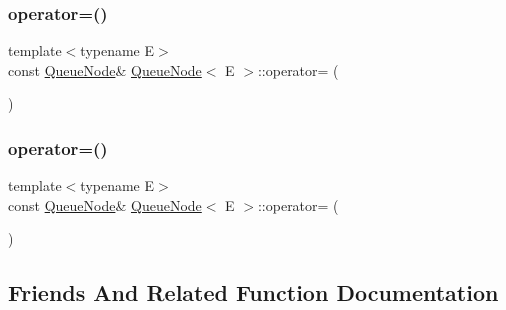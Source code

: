 \mbox{\label{class_queue_node_a8635bbe6310e011ef4fcf1a01566dbb7}} 
\subsubsection{\texorpdfstring{operator=()}{operator=()}\hspace{0.1cm}{\footnotesize\ttfamily [2/3]}}
{\footnotesize\ttfamily template$<$typename E$>$ \\
const \mbox{\hyperlink{class_queue_node}{Queue\+Node}}\& \mbox{\hyperlink{class_queue_node}{Queue\+Node}}$<$ E $>$\+::operator= (\begin{DoxyParamCaption}\item[{const \mbox{\hyperlink{class_queue_node}{Queue\+Node}}$<$ E $>$ \&}]{ }\end{DoxyParamCaption})\hspace{0.3cm}{\ttfamily [private]}}

\mbox{\label{class_queue_node_a8635bbe6310e011ef4fcf1a01566dbb7}} 
\subsubsection{\texorpdfstring{operator=()}{operator=()}\hspace{0.1cm}{\footnotesize\ttfamily [3/3]}}
{\footnotesize\ttfamily template$<$typename E$>$ \\
const \mbox{\hyperlink{class_queue_node}{Queue\+Node}}\& \mbox{\hyperlink{class_queue_node}{Queue\+Node}}$<$ E $>$\+::operator= (\begin{DoxyParamCaption}\item[{const \mbox{\hyperlink{class_queue_node}{Queue\+Node}}$<$ E $>$ \&}]{ }\end{DoxyParamCaption})\hspace{0.3cm}{\ttfamily [private]}}



\subsection{Friends And Related Function Documentation}
\mbox{\label{class_queue_node_ad4336229b1d7c3626e4ba69f236b202d}} 
